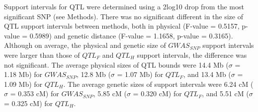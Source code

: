 \documentclass[article,9pt,twocolumn,twoside]{rilabRxiv}
\begin{document}
Support intervals for QTL were determined using a 2log10 drop from the most significant SNP (see Methods).
There was no significant different in the size of QTL support intervals between methods, both in physical (F-value = 0.5157, p-value = 0.5989) and genetic distance (F-value = 1.1658, p-value = 0.3165).
Although on average, the physical and genetic size of $GWAS_{SNP}$ support intervals were larger than those of $QTL_F$ and $QTL_H$ support intervals, the difference was not significant.
The average physical sizes of QTL bounds were 14.4 Mb ($\sigma$ = 1.18 Mb) for $GWAS_{SNP}$, 12.8 Mb ($\sigma$ = 1.07 Mb) for $QTL_F$, and 13.4 Mb ($\sigma$ = 1.09 Mb) for $QTL_H$.
The average genetic sizes of support intervals were 6.24 cM ($\sigma$ = 0.353 cM) for $GWAS_{SNP}$, 5.85 cM ($\sigma$ = 0.320 cM) for $QTL_F$, and 5.51 cM ($\sigma$ = 0.325 cM) for $QTL_H$.





\end{document}
